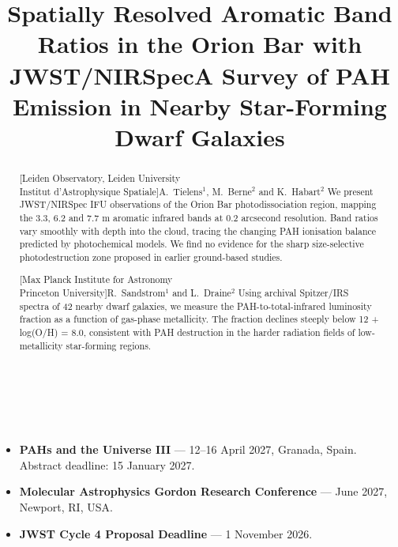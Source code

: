 \documentclass{astropah}
\begin{document}
\newpage
\begin{abstracts}

  \title{Spatially Resolved Aromatic Band Ratios in the Orion Bar with
    JWST/NIRSpec}
  \begin{abstract}[Leiden Observatory, Leiden University \\ Institut
      d'Astrophysique Spatiale]{A.\ Tielens$^1$, M.\ Berne$^2$ and
      K.\ Habart$^2$}
    We present JWST/NIRSpec IFU observations of the Orion Bar photodissociation
    region, mapping the 3.3, 6.2 and 7.7 \textmu m aromatic infrared bands at
    0.2 arcsecond resolution. Band ratios vary smoothly with depth into the
    cloud, tracing the changing PAH ionisation balance predicted by
    photochemical models. We find no evidence for the sharp size-selective
    photodestruction zone proposed in earlier ground-based studies.
  \end{abstract}

  \title{A Survey of PAH Emission in Nearby Star-Forming Dwarf Galaxies}
  \begin{abstract}[Max Planck Institute for Astronomy \\ Princeton
      University]{R.\ Sandstrom$^1$ and L.\ Draine$^2$}
    Using archival Spitzer/IRS spectra of 42 nearby dwarf galaxies, we measure
    the PAH-to-total-infrared luminosity fraction as a function of gas-phase
    metallicity. The fraction declines steeply below 12 + log(O/H) = 8.0,
    consistent with PAH destruction in the harder radiation fields of
    low-metallicity star-forming regions.
  \end{abstract}

\end{abstracts}

\newpage
{}
\section*{~}
\normalsize

\begin{itemize}
  \item \textbf{PAHs and the Universe III} --- 12--16 April 2027,
    Granada, Spain. Abstract deadline: 15 January 2027.
  \item \textbf{Molecular Astrophysics Gordon Research Conference} ---
    June 2027, Newport, RI, USA.
  \item \textbf{JWST Cycle 4 Proposal Deadline} --- 1 November 2026.
\end{itemize}
\end{document}
